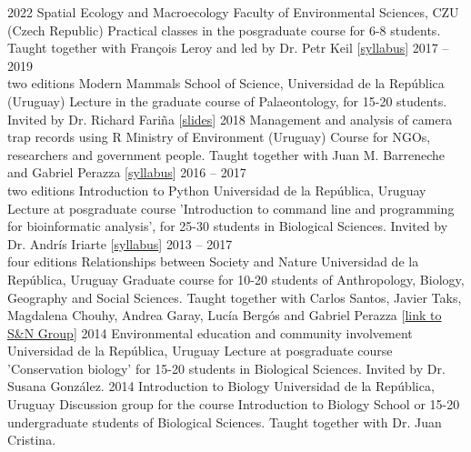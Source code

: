 \documentclass[9pt]{developercv} %
\begin{document}
\begin{entrylist}
	\entry
		{2022}
		{Spatial Ecology and Macroecology}
		{Faculty of Environmental Sciences, CZU (Czech Republic)}
		{Practical classes in the posgraduate course for 6-8 students. Taught together with François Leroy and led by Dr. Petr Keil [\href{https://petrkeil.github.io/courses/post/2022/09/09/Spatial_ecology.html}{syllabus}]}
	\entry
		{2017 -- 2019\\\footnotesize{two editions}}
		{Modern Mammals}
		{School of Science, Universidad de la Rep\'{u}blica (Uruguay)}
		{Lecture in the graduate course of Palaeontology, for 15-20 students. Invited by Dr. Richard Fari\~{n}a [\href{https://flograttarola.com/pdf/mamiferos_julana.pdf}{slides}]}
	\entry
		{2018}
		{Management and analysis of camera trap records using R}
		{Ministry of Environment (Uruguay)}
		{Course for NGOs, researchers and government people. Taught together with Juan M. Barreneche and Gabriel Perazza [\href{https://github.com/bienflorencia/curso_camtrapR}{syllabus}]}
	\entry
		{2016 -- 2017\\\footnotesize{two editions}}
		{Introduction to Python}
		{Universidad de la Rep\'{u}blica, Uruguay}
		{Lecture at posgraduate course 'Introduction to command line and programming for bioinformatic analysis', for 25-30 students in Biological Sciences. Invited by Dr. Andr\'{i}s Iriarte [\href{https://github.com/bienflorencia/clases_python}{syllabus}]}
	\entry
		{2013 -- 2017\\\footnotesize{four editions}}
		{Relationships between Society and Nature}
		{Universidad de la Rep\'{u}blica, Uruguay}
		{Graduate course for 10-20 students of Anthropology, Biology, Geography and Social Sciences. Taught together with Carlos Santos, Javier Taks, Magdalena Chouhy, Andrea Garay, Luc\'{i}a Berg\'{o}s and Gabriel Perazza [\href{https://udelar.edu.uy/retema/actividades/grupos-de-trabajo/}{link to S\&N Group}]}
	\entry
		{2014}
		{Environmental education and community involvement}
		{Universidad de la Rep\'{u}blica, Uruguay}
		{Lecture at posgraduate course 'Conservation biology' for 15-20 students in Biological Sciences. Invited by Dr. Susana Gonz\'{a}lez. }
	\entry
		{2014}
		{Introduction to Biology}
		{Universidad de la Rep\'{u}blica, Uruguay}
		{Discussion group for the course Introduction to Biology School or 15-20 undergraduate students of Biological Sciences. Taught together with Dr. Juan Cristina.}
\end{entrylist}

\end{document}
